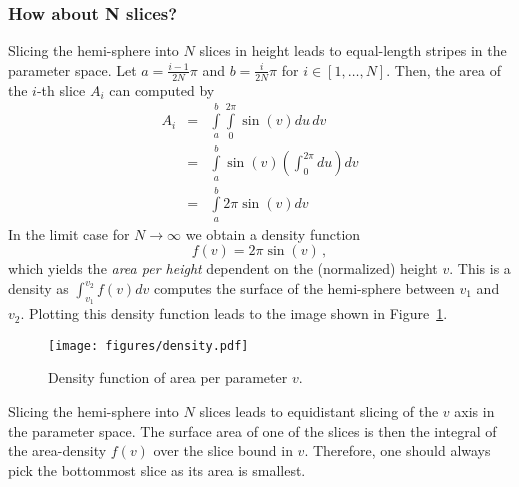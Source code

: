 \documentclass{scrartcl}
\begin{document}
\subsubsection*{How about N slices?}
Slicing the hemi-sphere into $N$ slices in height leads to equal-length stripes in the parameter space.
Let $a = \frac{i-1}{2N}\pi$ and $b = \frac{i}{2N}\pi$ for $i \in [1, \ldots, N]$. Then, the area of the $i$-th slice $A_i$ can computed by
\begin{eqnarray}
	A_i &=& \int\limits_a^b \int\limits_0^{2\pi} \sin(v) du\, dv\\
	&=& \int\limits_a^b \sin(v) \left(\int_0^{2\pi} du\right)dv\\\nonumber
	&=& \int\limits_a^b 2\pi \sin(v) dv\nonumber
\end{eqnarray}
In the limit case for $N \rightarrow \infty$ we obtain a density function
\begin{equation}
	f(v) = 2\pi \sin(v)\, ,
\end{equation}
which yields the \emph{area per height} dependent on the (normalized) height $v$. This is a density as $\int_{v_1}^{v_2} f(v)dv$ computes the surface of the hemi-sphere between $v_1$ and $v_2$. Plotting this density function leads to the image shown in Figure~\ref{fig:area_density}.
\begin{figure}[h]
	\centering
	\texttt{[image: figures/density.pdf]}
	\caption{Density function of area per parameter $v$.}
	\label{fig:area_density}
\end{figure}

\noindent
Slicing the hemi-sphere into $N$ slices leads to equidistant slicing of the $v$ axis in the parameter space.
The surface area of one of the slices is then the integral of the area-density $f(v)$ over the slice bound in $v$. Therefore, one should always pick the bottommost slice as its area is smallest.
\end{document}
